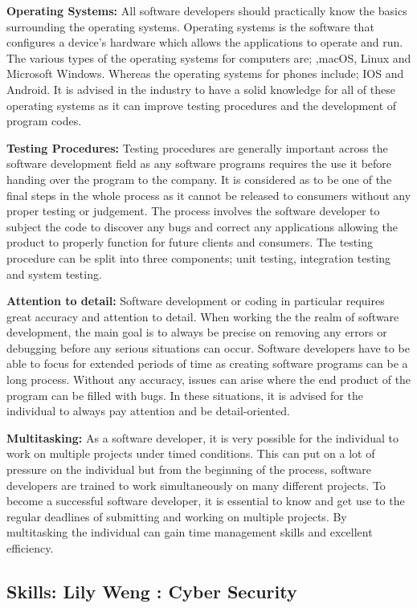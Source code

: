 \documentclass[a4paper, 11pt]{report}
\begin{document}
\textbf{Operating Systems:} 
All software developers should practically know the basics surrounding the operating systems. Operating systems is the software that configures a device's hardware which allows the applications to operate and run. The various types of the operating systems for computers are; ,macOS, Linux and Microsoft Windows. Whereas the operating systems for phones include; IOS and Android. It is advised in the industry to have a solid knowledge for all of these operating systems as it can improve testing procedures and the development of program codes. 

\textbf{Testing Procedures:} 
Testing procedures are generally important across the software development field as any software programs requires the use it before handing over the program to the company. It is considered as to be one of the final steps in the whole process as it cannot be released to consumers without any proper testing or judgement. The process involves the software developer to subject the code to discover any bugs and correct any applications allowing the product to properly function for future clients and consumers. The testing procedure can be split into three components; unit testing, integration testing and system testing.  

\textbf{Attention to detail:} 
Software development or coding in particular requires great accuracy and attention to detail. When working the the realm of software development, the main goal is to always be precise on removing any errors or debugging before any serious situations can occur. Software developers have to be able to focus for extended periods of time as creating software programs can be a long process. Without any accuracy, issues can arise where the end product of the program can be filled with bugs. In these situations, it is advised for the individual to always pay attention and be detail-oriented.

\textbf{Multitasking:} 
As a software developer, it is very possible for the individual to work on multiple projects under timed conditions. This can put on a lot of pressure on the individual but from the beginning of the process, software developers are trained to work simultaneously on many different projects. To become a successful software developer, it is essential to know and get use to the regular deadlines of submitting and working on multiple projects. By multitasking the individual can gain time management skills and excellent efficiency.  

\subsection{Skills: Lily Weng : Cyber Security}
\end{document}
